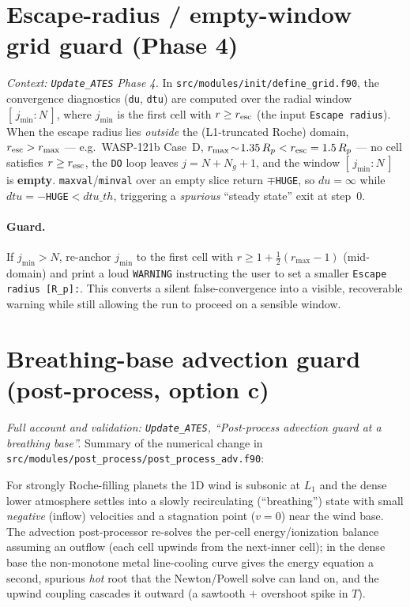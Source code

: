 \documentclass[english,a4paper]{kiseon_memo}
\begin{document}
\section{Escape-radius / empty-window grid guard (Phase 4)}\label{sec:grid}
\emph{Context: \texttt{Update\_ATES} Phase 4.} In
\texttt{src/modules/init/define\_grid.f90}, the convergence diagnostics
(\texttt{du}, \texttt{dtu}) are computed over the radial window
$[\,j_{\min}:N\,]$, where $j_{\min}$ is the first cell with $r\ge r_{\rm esc}$
(the input \texttt{Escape radius}). When the escape radius lies \emph{outside} the
(L1-truncated Roche) domain, $r_{\rm esc}>r_{\max}$ --- e.g.\ WASP-121b Case~D,
$r_{\max}\!\sim\!1.35\,R_p < r_{\rm esc}=1.5\,R_p$ --- no cell satisfies
$r\ge r_{\rm esc}$, the \texttt{DO} loop leaves $j=N+N_g+1$, and the window
$[\,j_{\min}:N\,]$ is \textbf{empty}. \texttt{maxval}/\texttt{minval} over an empty
slice return $\mp$\texttt{HUGE}, so $du=\infty$ while $dtu=-$\texttt{HUGE}$<dtu\_th$,
triggering a \emph{spurious} ``steady state'' exit at step~0.

\paragraph{Guard.} If $j_{\min}>N$, re-anchor $j_{\min}$ to the first cell with
$r\ge 1+\tfrac12(r_{\max}-1)$ (mid-domain) and print a loud \texttt{WARNING}
instructing the user to set a smaller \texttt{Escape radius [R\_p]:}. This converts
a silent false-convergence into a visible, recoverable warning while still allowing
the run to proceed on a sensible window.

\section{Breathing-base advection guard (post-process, option c)}\label{sec:breath}
\emph{Full account and validation: \texttt{Update\_ATES}, ``Post-process advection
guard at a breathing base''.} Summary of the numerical change in
\texttt{src/modules/post\_process/post\_process\_adv.f90}:

For strongly Roche-filling planets the 1D wind is subsonic at $L_1$ and the dense
lower atmosphere settles into a slowly recirculating (``breathing'') state with
small \emph{negative} (inflow) velocities and a stagnation point ($v=0$) near the
wind base. The advection post-processor re-solves the per-cell energy/ionization
balance assuming an outflow (each cell upwinds from the next-inner cell); in the
dense base the non-monotone metal line-cooling curve gives the energy equation a
second, spurious \emph{hot} root that the Newton/Powell solve can land on, and the
upwind coupling cascades it outward (a sawtooth $+$ overshoot spike in $T$).
\end{document}
